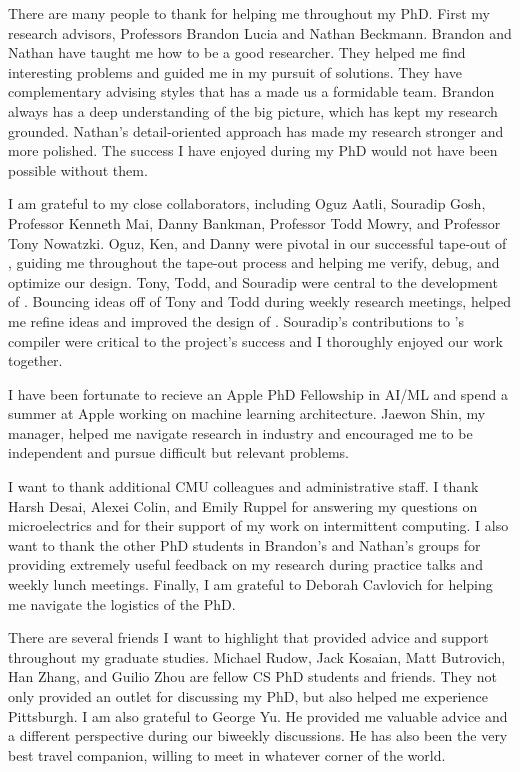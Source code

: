 \begin{acknowledgements}
\addchaptertocentry{\acknowledgementname} %
There are many people to thank for helping me throughout my PhD.
% 
First my research advisors, Professors Brandon Lucia and Nathan Beckmann.
% 
Brandon and Nathan have taught me how to be a good researcher.
% 
They helped me find interesting problems and guided me in my pursuit of solutions.
% 
They have complementary advising styles that has a made us a formidable team.
% 
Brandon always has a deep understanding of the big picture, which has kept my research grounded.
% 
Nathan's detail-oriented approach has made my research stronger and more polished.
% 
The success I have enjoyed during my PhD would not have been possible without them.

I am grateful to my close collaborators, including Oguz Aatli, Souradip Gosh, Professor Kenneth Mai, Danny Bankman, Professor Todd Mowry, and Professor Tony Nowatzki.
%
Oguz, Ken, and Danny were pivotal in our successful tape-out of \manic, guiding me throughout the tape-out process and helping me verify, debug, and optimize our design.
% 
Tony, Todd, and Souradip were central to the development of \riptide.
% 
Bouncing ideas off of Tony and Todd during weekly research meetings, helped me refine ideas and improved the design of \riptide.
% 
Souradip's contributions to \riptide's compiler were critical to the project's success and I thoroughly enjoyed our work together.

I have been fortunate to recieve an Apple PhD Fellowship in AI/ML and spend a summer at Apple working on machine learning architecture.
% 
Jaewon Shin, my manager, helped me navigate research in industry and encouraged me to be independent and pursue difficult but relevant problems.

I want to thank additional CMU colleagues and administrative staff.
% 
I thank Harsh Desai, Alexei Colin, and Emily Ruppel for answering my questions on microelectrics and for their support of my work on intermittent computing.
% 
I also want to thank the other PhD students in Brandon's and Nathan's groups for providing extremely useful feedback on my research during practice talks and weekly lunch meetings.
% 
Finally, I am grateful to Deborah Cavlovich for helping me navigate the logistics of the PhD.

There are several friends I want to highlight that provided advice and support throughout my graduate studies.
% 
Michael Rudow, Jack Kosaian, Matt Butrovich, Han Zhang, and Guilio Zhou are fellow CS PhD students and friends. 
% 
They not only provided an outlet for discussing my PhD, but also helped me experience Pittsburgh.
% 
I am also grateful to George Yu.
% 
He provided me valuable advice and a different perspective during our biweekly discussions.
% 
He has also been the very best travel companion, willing to meet in whatever corner of the world.


\end{acknowledgements}
